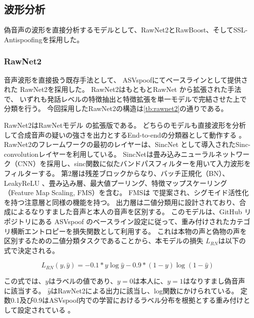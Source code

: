 \subsection{波形分析}
偽音声の波形を直接分析するモデルとして、RawNet2とRawBoost、そしてSSL-Antispoofingを採用した。

\subsubsection{RawNet2}
音声波形を直接扱う既存手法として、
ASVspoofにてベースラインとして提供された \cite{WANG2020101114}RawNet2を採用した。
RawNet2はもともとRawNet \cite{jung19b_interspeech}から拡張された手法で、
いずれも発話レベルの特徴抽出と特徴拡張を単一モデルで完結させた上で分類を行う。
今回採用したRawNet2の構造は\cref{tb:rawnet2}の通りである。

RawNet2はRawNetモデル \cite{jung19b_interspeech}の拡張版である。
どちらのモデルも直接波形を分析して合成音声の疑いの強さを出力とするEnd-to-endの分類器として動作する \cite{jung19b_interspeech}。
RawNet2のフレームワークの最初のレイヤーは、SincNet \cite{8639585,ravanelli19_interspeech}として導入されたSinc-convolutionレイヤーを利用している。
SincNetは畳み込みニューラルネットワーク（CNN）を採用し、sinc関数に似たバンドパスフィルターを用いて入力波形をフィルターする。
第2層は残差ブロックからなり、バッチ正規化（BN）、LeakyReLU \cite{maas2013rectifier}、畳み込み層、最大値プーリング、特徴マップスケーリング（Feature Map Scaling, FMS）を含む。
FMSは \cite{woo2018cbam}で提案され、シグモイド活性化 \cite{jung20c_interspeech}を持つ注意層と同様の機能を持つ。
出力層は二値分類用に設計されており、合成によるなりすました音声と本人の音声を区別する。
このモデルは、GitHub リポジトリにある ASVspoof のベースライン設定に従って、重み付けされたカテゴリ横断エントロピーを損失関数として利用する。
これは本物の声と偽物の声を区別するための二値分類タスクであることから、本モデルの損失 $ L_{RN} $は以下の式で決定される。

\begin{equation}
    L_{RN}(y, \hat{y}) = -0.1 * y \log{\hat{y}} - 0.9 * (1-y) \log{(1-\hat{y})}
\end{equation}

この式では、$y$はラベルの値であり、$y=0$は本人に、$y=1$はなりすまし偽音声に該当する。
$\hat{y}$はRawNet2による出力に該当し、log関数にかけられている。
定数0.1及び0.9はASVspoof内での学習におけるラベル分布を根拠とする重み付けとして設定されている \cite{yamagishi21_asvspoof}。


